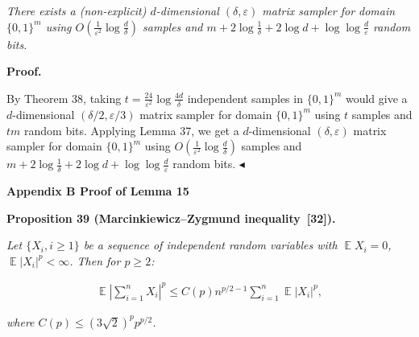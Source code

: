 \emph{There exists a (non-explicit) $d$-dimensional $(\delta,\varepsilon)$ matrix sampler for domain $\{0,1\}^{m}$ using $O(\frac{1}{\varepsilon^{2}}\log\frac{d}{\delta})$ samples and $m+2\log\frac{1}{\delta}+2\log d+\log\log\frac{d}{\varepsilon}$ random bits.}\par








\par\medskip\noindent\textbf{Proof.}\par




By Theorem 38, taking $t=\frac{24}{\varepsilon^{2}}\log\frac{4d}{\delta}$ independent samples in $\{0,1\}^{m}$ would give a $d$-dimensional $(\delta/2,\varepsilon/3)$ matrix sampler for domain $\{0,1\}^{m}$ using $t$ samples and $tm$ random bits. Applying Lemma 37, we get a $d$-dimensional $(\delta,\varepsilon)$ matrix sampler for domain $\{0,1\}^{m}$ using $O(\frac{1}{\varepsilon^{2}}\log\frac{d}{\delta})$ samples and $m+2\log\frac{1}{\delta}+2\log d+\log\log\frac{d}{\varepsilon}$ random bits.
$\blacktriangleleft$\par






\par\medskip\noindent\textbf{
Appendix B Proof of Lemma 15
}\par





\par\medskip\noindent\textbf{
\textbf{Proposition 39}\textbf{ }(Marcinkiewicz–Zygmund inequality [32])\textbf{.}
}\par



\emph{Let $\{X_{i},i\geq 1\}$ be a sequence of independent random variables with $\operatorname*{\mathbb{E}}X_{i}=0$, $\operatorname*{\mathbb{E}}|X_{i}|^{p}<\infty$. Then for $p\geq 2$:}\par


\[\begin{gathered}
\operatorname*{\mathbb{E}}\left|\sum_{i=1}^{n}X_{i}\right|^{p}\leq C(p)n^{p/2-1}\sum_{i=1}^{n}\operatorname*{\mathbb{E}}|X_{i}|^{p},
\end{gathered}\]


\emph{where $C(p)\leq(3\sqrt{2})^{p}p^{p/2}$.}\par



